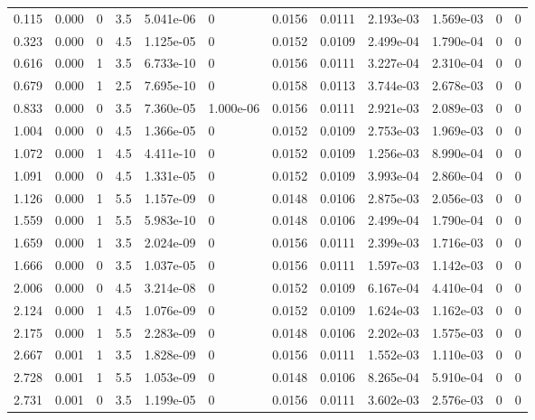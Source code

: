 \documentclass[preview]{standalone}
\begin{document}
{{\begin{tabular}{L{1.2cm}C{1.2cm} C{0.3cm}C{0.5cm} C{1.4cm}C{1.4cm} C{1.4cm}C{1.4cm} C{1.6cm}C{1.6cm} C{1.6cm}C{1.6cm}}
  0.115  &  0.000  & 0     & 3.5 &  5.041e-06  & 0  &  0.0156&   0.0111& 2.193e-03 & 1.569e-03   &  0 & 0  \\ 
  0.323  &  0.000  & 0     & 4.5 &  1.125e-05  & 0  &  0.0152&   0.0109& 2.499e-04 & 1.790e-04   &  0 & 0  \\ 
  0.616  &  0.000  & 1     & 3.5 &  6.733e-10  & 0  &  0.0156&   0.0111& 3.227e-04 & 2.310e-04   &  0 & 0  \\ 
  0.679  &  0.000  & 1     & 2.5 &  7.695e-10  & 0  &  0.0158&   0.0113& 3.744e-03 & 2.678e-03   &  0 & 0  \\ 
  0.833  &  0.000  & 0     & 3.5 &  7.360e-05  & 1.000e-06  &  0.0156&   0.0111& 2.921e-03 & 2.089e-03   &  0 & 0  \\ 
  1.004  &  0.000  & 0     & 4.5 &  1.366e-05  & 0  &  0.0152&   0.0109& 2.753e-03 & 1.969e-03   &  0 & 0  \\ 
  1.072  &  0.000  & 1     & 4.5 &  4.411e-10  & 0  &  0.0152&   0.0109& 1.256e-03 & 8.990e-04   &  0 & 0  \\ 
  1.091  &  0.000  & 0     & 4.5 &  1.331e-05  & 0  &  0.0152&   0.0109& 3.993e-04 & 2.860e-04   &  0 & 0  \\ 
  1.126  &  0.000  & 1     & 5.5 &  1.157e-09  & 0  &  0.0148&   0.0106& 2.875e-03 & 2.056e-03   &  0 & 0  \\ 
  1.559  &  0.000  & 1     & 5.5 &  5.983e-10  & 0  &  0.0148&   0.0106& 2.499e-04 & 1.790e-04   &  0 & 0  \\ 
  1.659  &  0.000  & 1     & 3.5 &  2.024e-09  & 0  &  0.0156&   0.0111& 2.399e-03 & 1.716e-03   &  0 & 0  \\ 
  1.666  &  0.000  & 0     & 3.5 &  1.037e-05  & 0  &  0.0156&   0.0111& 1.597e-03 & 1.142e-03   &  0 & 0  \\ 
  2.006  &  0.000  & 0     & 4.5 &  3.214e-08  & 0  &  0.0152&   0.0109& 6.167e-04 & 4.410e-04   &  0 & 0  \\ 
  2.124  &  0.000  & 1     & 4.5 &  1.076e-09  & 0  &  0.0152&   0.0109& 1.624e-03 & 1.162e-03   &  0 & 0  \\ 
  2.175  &  0.000  & 1     & 5.5 &  2.283e-09  & 0  &  0.0148&   0.0106& 2.202e-03 & 1.575e-03   &  0 & 0  \\ 
  2.667  &  0.001  & 1     & 3.5 &  1.828e-09  & 0  &  0.0156&   0.0111& 1.552e-03 & 1.110e-03   &  0 & 0  \\ 
  2.728  &  0.001  & 1     & 5.5 &  1.053e-09  & 0  &  0.0148&   0.0106& 8.265e-04 & 5.910e-04   &  0 & 0  \\ 
  2.731  &  0.001  & 0     & 3.5 &  1.199e-05  & 0  &  0.0156&   0.0111& 3.602e-03 & 2.576e-03   &  0 & 0  \\ 

\end{tabular}}}
\end{document}
